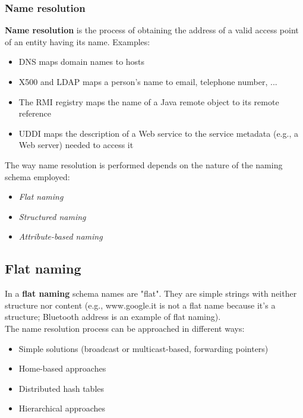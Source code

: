 \documentclass[10pt,a4paper]{article}
\begin{document}
\subsubsection{Name resolution}
\textbf{Name resolution} is the process of obtaining the address of a valid access point of an entity having its name. Examples:
\begin{itemize}
	\item DNS maps domain names to hosts
	\item X500 and LDAP maps a person's name to email, telephone number, ...
	\item The RMI registry maps the name of a Java remote object to its remote reference
	\item UDDI maps the description of a Web service to the service metadata (e.g., a Web server) needed to access it
\end{itemize}
The way name resolution is performed depends on the nature of the naming schema employed:
\begin{itemize}
	\item \textit{Flat naming}
	\item \textit{Structured naming}
	\item \textit{Attribute-based naming}
\end{itemize}
\subsection{Flat naming}
In a \textbf{flat naming} schema names are "flat". They are simple strings with neither structure nor content (e.g., www.google.it is not a flat name because it's a structure; Bluetooth address is an example of flat naming). \\ The name resolution process can be approached in different ways:
\begin{itemize}
	\item Simple solutions (broadcast or multicast-based, forwarding pointers)
	\item Home-based approaches
	\item Distributed hash tables
	\item Hierarchical approaches
\end{itemize}
\end{document}
